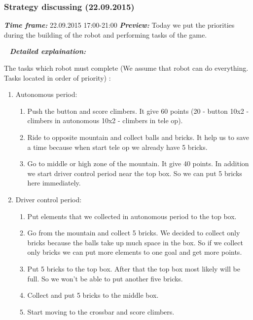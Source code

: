 \addtocounter{number_of_meeting}{1}
\subsubsection{Strategy discussing (22.09.2015)}
	\textit{\textbf{Time frame:}} 22.09.2015 17:00-21:00 \newline
	\textit{\textbf{Preview:}} Today we put the priorities during the building of the robot and performing tasks of the game.\newline \newline
  
   \newline
  \textit{\textbf{Detailed explaination:}}
  \begin{enumerate*}
  	\item The tasks which robot must complete (We assume that robot can do everything. Tasks located in order of priority) :
  	\begin{enumerate}
  		\item Autonomous period:
  		\begin{enumerate}
  			\item Push the button and score climbers. It give 60 points (20 - button 10x2 - climbers in autonomous 10x2 - climbers in tele op).
  			\item Ride to opposite mountain and collect balls and bricks. It help us to save a time because when start tele op we already have 5 bricks. 
  			\item Go to middle or high zone of the mountain. It give 40 points. In addition we start driver control period near the top box. So we can put 5 bricks here immediately.
  		\end{enumerate}
  		\item Driver control period:
  		\begin{enumerate}
	  		\item Put elements that we collected in autonomous period to the top box.
	  		\item Go from the mountain and collect 5 bricks. We decided to collect only bricks because the balls take up much space in the box. So if we collect only bricks we can put more elements to one goal and get more points.
	  		\item Put 5 bricks to the top box. After that the top box most likely will be full. So we won't be able to put another five bricks.
	  		\item Collect and put 5 bricks to the middle box.
	  		\item Start moving to the crossbar and score climbers.

\end{enumerate}
\end{enumerate}
\end{enumerate*}
